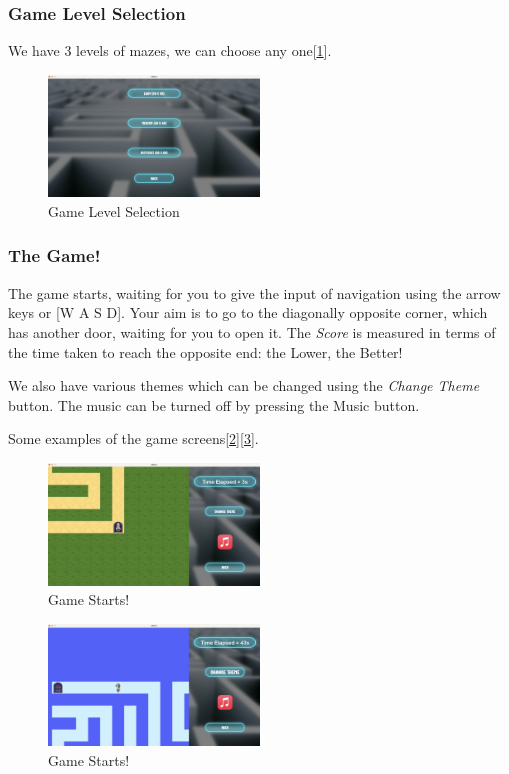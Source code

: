 \documentclass[10pt]{article}
\begin{document}
    \subsubsection{Game Level Selection}
    We have 3 levels of mazes, we can choose any one[\ref{fig:GameLevel}].
    \begin{figure}[h!]
        \centering
        \includegraphics[width=0.5\textwidth]{GameLevel}
        \caption{Game Level Selection}\label{fig:GameLevel}
    \end{figure}

    \subsubsection{The Game!}
    The game starts, waiting for you to give the input of navigation using the arrow keys or [W A S D].
    Your aim is to go to the diagonally opposite corner, which has another door, waiting for you to open it.
    The \emph{Score} is measured in terms of the time taken to reach the opposite end: the Lower, the Better!

    We also have various themes which can be changed using the \emph{Change Theme} button.
    The music can be turned off by pressing the Music button.

    Some examples of the game screens[\ref{fig:GameStart}][\ref{fig:GamePlay}].
    \begin{figure}[h!]
        \centering
        \includegraphics[width=0.5\textwidth]{MazeGame}
        \caption{Game Starts!}\label{fig:GameStart}
    \end{figure}
    \begin{figure}[h!]
        \centering
        \includegraphics[width=0.5\textwidth]{MazeGameThemes}
        \caption{Game Starts!}\label{fig:GamePlay}
    \end{figure}
\end{document}

